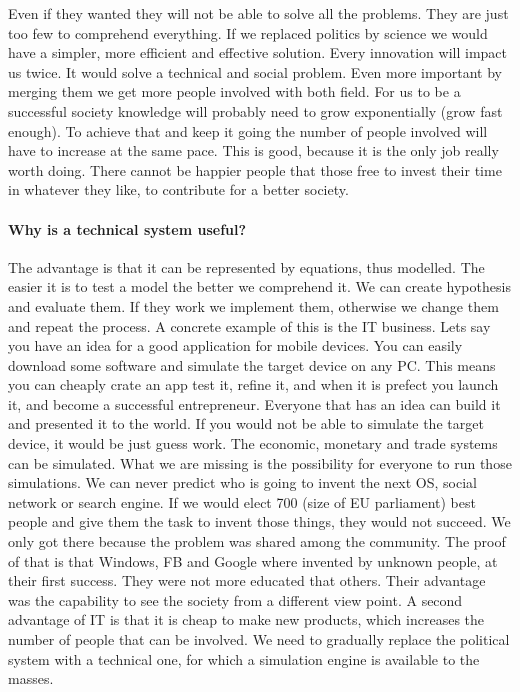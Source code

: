\documentclass{article}
\begin{document}
Even if they wanted they will not be able to solve all the problems.
They are just too few to comprehend everything.
If we replaced politics by science we would have a simpler, more efficient and effective solution.
Every innovation will impact us twice.
It would solve a technical and social problem.
Even more important by merging them we get more people involved with both field.
For us to be a successful society knowledge will probably need to grow exponentially (grow fast enough).
To achieve that and keep it going the number of people involved will have to increase at the same pace.
This is good, because it is the only job really worth doing.
There cannot be happier people that those free to invest their time in whatever they like, to contribute for a better society.

\paragraph{Why is a technical system useful?}
The advantage is that it can be represented by equations, thus modelled.
The easier it is to test a model the better we comprehend it.
We can create hypothesis and evaluate them.
If they work we implement them, otherwise we change them and repeat the process.
A concrete example of this is the IT business.
Lets say you have an idea for a good application for mobile devices.
You can easily download some software and simulate the target device on any PC.
This means you can cheaply crate an app test it, refine it, and when it is prefect you launch it, and become a successful entrepreneur.
Everyone that has an idea can build it and presented it to the world.
If you would not be able to simulate the target device, it would be just guess work.
The economic, monetary and trade systems can be simulated.
What we are missing is the possibility for everyone to run those simulations.
We can never predict who is going to invent the next OS, social network or search engine.
If we would elect 700 (size of EU parliament) best people and give them the task to invent those things, they would not succeed.
We only got there because the problem was shared among the community.
The proof of that is that Windows, FB and Google where invented by unknown people, at  their first success.
They were not more educated that others.
Their advantage was the capability to see the society from a different view point.
A second advantage of IT is that it is cheap to make new products, which increases the number of people that can be involved.
We need to gradually replace the political system with a technical one, for which a simulation engine is available to the masses.
\end{document}
